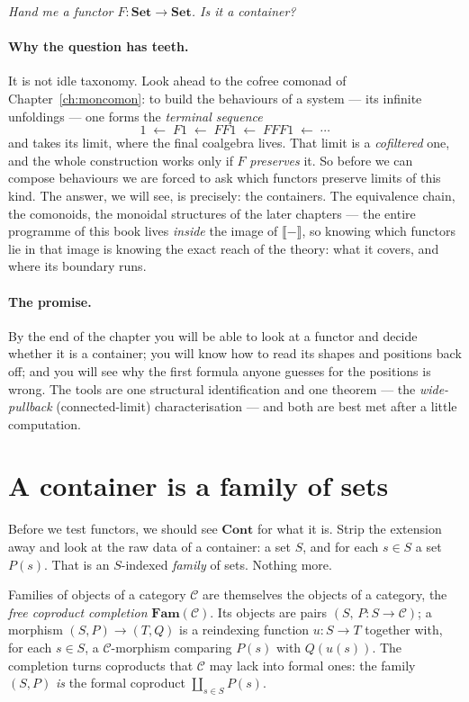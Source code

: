 \documentclass[11pt,a4paper]{book}
\newcommand{\Set}{\mathbf{Set}}
\newcommand{\Cont}{\mathbf{Cont}}
\newcommand{\Fam}{\mathbf{Fam}}
\newcommand{\Ext}[1]{\llbracket #1 \rrbracket}
\theoremstyle{plain}
\theoremstyle{definition}
\theoremstyle{remark}
\begin{document}
\begin{center}
\itshape Hand me a functor $F\colon\Set\to\Set$. Is it a container?
\end{center}

\paragraph{Why the question has teeth.} It is not idle taxonomy. Look ahead to the
cofree comonad of Chapter~\ref{ch:moncomon}: to build the behaviours of a system ---
its infinite unfoldings --- one forms the \emph{terminal sequence}
\[
  1 \;\longleftarrow\; F1 \;\longleftarrow\; FF1 \;\longleftarrow\; FFF1
    \;\longleftarrow\;\cdots
\]
and takes its limit, where the final coalgebra lives. That limit is a
\emph{cofiltered} one, and the whole construction works only if $F$
\emph{preserves} it. So before we can compose behaviours we are forced to ask which
functors preserve limits of this kind. The answer, we will see, is precisely: the
containers. The equivalence chain, the comonoids, the monoidal structures of the
later chapters --- the entire programme of this book lives \emph{inside} the image
of $\Ext{-}$, so knowing which functors lie in that image is knowing the exact
reach of the theory: what it covers, and where its boundary runs.

\paragraph{The promise.} By the end of the chapter you will be able to look at a
functor and decide whether it is a container; you will know how to read its shapes
and positions back off; and you will see why the first formula anyone guesses for
the positions is wrong. The tools are one structural identification and one theorem
--- the \emph{wide-pullback} (connected-limit) characterisation --- and both are
best met after a little computation.

\section{A container is a family of sets}
\label{sec:fam}

Before we test functors, we should see $\Cont$ for what it is. Strip the extension
away and look at the raw data of a container: a set $S$, and for each $s\in S$ a set
$P(s)$. That is an $S$-indexed \emph{family} of sets. Nothing more.

Families of objects of a category $\mathcal C$ are themselves the objects of a
category, the \emph{free coproduct completion} $\Fam(\mathcal C)$. Its objects are
pairs $(S,\,P\colon S\to\mathcal C)$; a morphism $(S,P)\to(T,Q)$ is a reindexing
function $u\colon S\to T$ together with, for each $s\in S$, a $\mathcal C$-morphism
comparing $P(s)$ with $Q(u(s))$. The completion turns coproducts that $\mathcal C$
may lack into formal ones: the family $(S,P)$ \emph{is} the formal coproduct
$\coprod_{s\in S}P(s)$.
\end{document}
